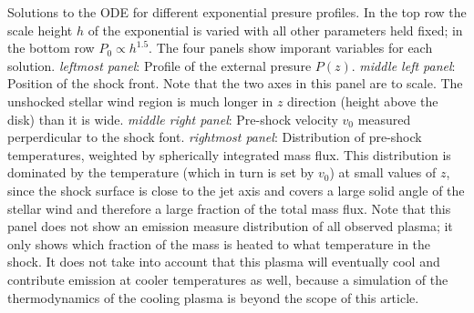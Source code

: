 \label{fig:p_ext}
Solutions to the ODE for different exponential presure profiles. In the top row the scale height $h$ of the exponential is varied with all other parameters held fixed; in the bottom row $P_0\propto h^{1.5}$.
The four panels show imporant variables for each solution. \emph{leftmost panel}: Profile of the external presure $P(z)$. \emph{middle left panel}: Position of the shock front. Note that the two axes in this panel are to scale. The unshocked stellar wind region is much longer in $z$ direction (height above the disk) than it is wide. \emph{middle right panel}: Pre-shock velocity $v_0$ measured perperdicular to the shock font. \emph{rightmost panel}: Distribution of pre-shock temperatures, weighted by spherically integrated mass flux. This distribution is dominated by the temperature (which in turn is set by $v_0$) at small values of $z$, since the shock surface is close to the jet axis and covers a large solid angle of the stellar wind and therefore a large fraction of the total mass flux. Note that this panel does not show an emission measure distribution of all observed plasma; it only shows which fraction of the mass is heated to what temperature in the shock. It does not take into account that this plasma will eventually cool and contribute emission at cooler temperatures as well, because a simulation of the thermodynamics of the cooling plasma is beyond the scope of this article.
